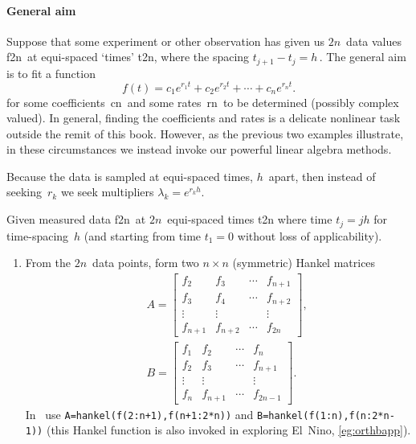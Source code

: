 \begin{draft}
\paragraph{General aim}
Suppose that some experiment or other observation has given us \(2n\)~data values \hlist f{2n}\ at equi-spaced `times' \hlist t{2n}, where the spacing \(t_{j+1}-t_j=h\)\,.
The general aim is to fit a function \cite[\S2.6, e.g.]{Cuyt2015}
\begin{equation}
f(t)=c_1e^{r_1t}+c_2e^{r_2t}+\cdots+c_ne^{r_nt}.
\end{equation}
for some coefficients~\hlist cn\ and some rates~\hlist rn\ to be determined (possibly complex valued).
In general, finding the coefficients and rates is a delicate nonlinear task outside the remit of this book.
However, as the previous two examples illustrate, in these circumstances we instead invoke our powerful linear algebra methods.

Because the data is sampled at equi-spaced times, \(h\)~apart, then instead of seeking~\(r_k\) we seek multipliers \(\lambda_k=e^{r_kh}\).

\begin{procedure} \label{pro:ei}
Given measured data \hlist f{2n}\ at \(2n\)~equi-spaced times \hlist t{2n} where time \(t_j=jh\) for time-spacing~\(h\) (and starting from time \(t_1=0\) without loss of applicability).
\begin{enumerate}
\item From the \(2n\)~data points, form two \(n\times n\) (symmetric) Hankel matrices 
\begin{eqnarray*}&&
A=\begin{bmatrix} f_2&f_3&\cdots&f_{n+1}
\\f_3&f_4&\cdots&f_{n+2}
\\\vdots&\vdots&&\vdots
\\f_{n+1}&f_{n+2}&\cdots&f_{2n} \end{bmatrix},
\\&&
B=\begin{bmatrix} f_1&f_2&\cdots&f_{n}
\\f_2&f_3&\cdots&f_{n+1}
\\\vdots&\vdots&&\vdots
\\f_{n}&f_{n+1}&\cdots&f_{2n-1} \end{bmatrix}.
\end{eqnarray*}
In \script\ use \verb|A=hankel(f(2:n+1),f(n+1:2*n))| and \verb|B=hankel(f(1:n),f(n:2*n-1))| (this Hankel function is also invoked in exploring El~Nino, \autoref{eg:orthbapp}).


\end{enumerate}
\end{procedure}
\end{draft}
